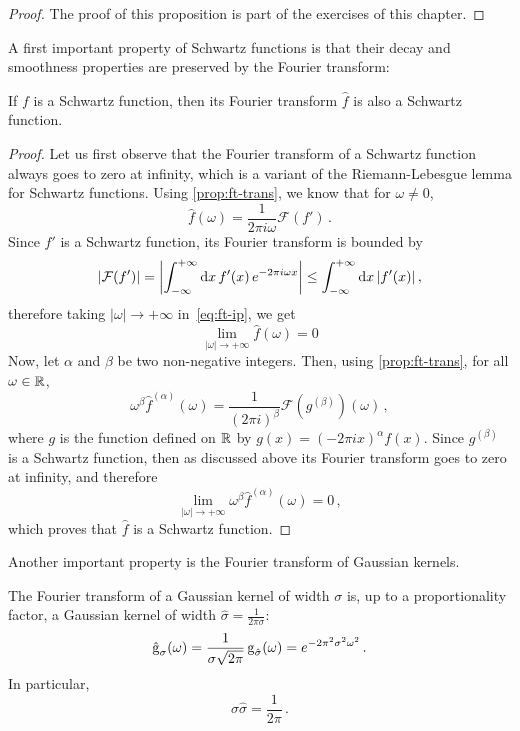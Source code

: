 \begin{proof}
  The proof of this proposition is part of the exercises of this chapter.
\end{proof}
A first important property of Schwartz functions is that their decay and smoothness
properties are preserved by the Fourier transform:
\begin{theorem}
  If $f$ is a Schwartz function, then its Fourier transform $\hat{f}$ is also a Schwartz
  function.
\end{theorem}
\begin{proof}
  Let us first observe that the Fourier transform of a Schwartz function always goes to
  zero at infinity, which is a variant of the Riemann-Lebesgue lemma for Schwartz
  functions. Using \cref{prop:ft-trans}, we know that for $\omega\neq 0$,
  \begin{equation}
    \hat{f}(\omega)=\frac{1}{2\pi i\omega}\mathcal{F}(f')\,.\label{eq:ft-ip}
  \end{equation}
  Since $f'$ is a Schwartz function, its Fourier transform is bounded by
  \begin{equation}
    |\mathcal{F}(f')|=\left|\int_{-\infty}^{+\infty}\mathrm{d}{x}\,f'(x)\,e^{-2\pi i \omega x}\right|\leq
    \int_{-\infty}^{+\infty}\mathrm{d}{x}\,|f'(x)|\,,
  \end{equation}
  therefore taking $|\omega|\to+\infty$ in~\cref{eq:ft-ip}, we get
  \begin{equation}
    \lim_{|\omega|\to+\infty}\hat{f}(\omega)=0
  \end{equation}
  Now, let $\alpha$ and $\beta$ be two non-negative integers. Then, using
  \cref{prop:ft-trans}, for all $\omega\in\mathbb{R}$,
  \begin{equation}
    \omega^\beta\hat{f}^{(\alpha)}(\omega)
    =\frac{1}{(2\pi i)^{\beta}}\mathcal{F}(g^{(\beta)})(\omega)\,,
  \end{equation}
  where $g$ is the function defined on $\mathbb{R}$ by $g(x)=(-2\pi ix)^{\alpha}f(x)$.
  Since $g^{(\beta)}$ is a Schwartz function, then as
  discussed above its Fourier transform goes to zero at infinity, and therefore
  \begin{equation}
    \lim_{|\omega|\to+\infty}\omega^\beta\hat{f}^{(\alpha)}(\omega)=0\,,
  \end{equation}
  which proves that $\hat{f}$ is a Schwartz function.
\end{proof}
Another important property is the Fourier transform of Gaussian kernels.
\begin{theorem}
  \label{thm:gauss-uncertainty}
  The Fourier transform of a Gaussian kernel of width $\sigma$ is, up to a proportionality
  factor, a Gaussian kernel of width $\hat{\sigma}=\frac{1}{2\pi\sigma}$:
  \begin{equation}
    \hat{\operatorname{g}}_{\sigma}(\omega)=
    \frac{1}{\sigma\sqrt{2\pi}}\operatorname{g}_{\hat{\sigma}}(\omega)
    =e^{-2\pi^2\sigma^2\omega^2}\,.
  \end{equation}
  In particular,
  \begin{equation}
    \sigma\hat{\sigma}=\frac{1}{2\pi}\,.\label{eq:gauss-uncertainty}
  \end{equation}
\end{theorem}
